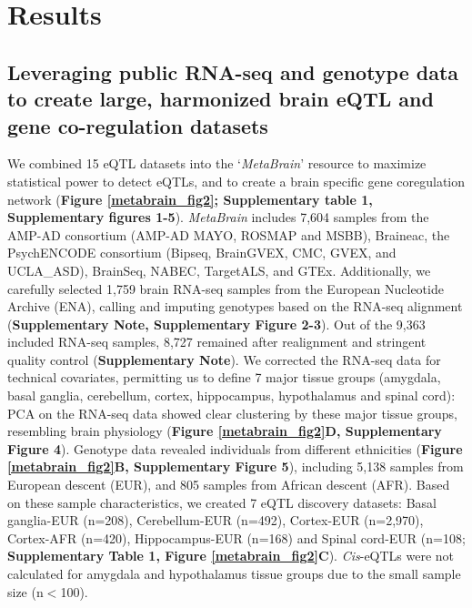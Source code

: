 \section{Results}
\subsection{Leveraging public RNA-seq and genotype data to create large, harmonized brain eQTL and gene co-regulation datasets}
We combined 15 eQTL datasets into the ‘\textit{MetaBrain}’ resource to maximize statistical power to detect eQTLs, and to create a brain specific gene coregulation network (\textbf{Figure \ref{metabrain_fig2}; Supplementary table 1, Supplementary figures 1-5}). \textit{MetaBrain} includes 7,604 samples from the AMP-AD consortium\cite{hodesAcceleratingMedicinesPartnership2016} (AMP-AD MAYO\cite{hodesAcceleratingMedicinesPartnership2016}, ROSMAP\cite{hodesAcceleratingMedicinesPartnership2016} and MSBB\cite{hodesAcceleratingMedicinesPartnership2016}), Braineac\cite{ramasamyGeneticVariabilityRegulation2014}, the PsychENCODE consortium\cite{consortium*RevealingBrainMolecular2018} (Bipseq\cite{wangComprehensiveFunctionalGenomic2018}, BrainGVEX\cite{wangComprehensiveFunctionalGenomic2018}, CMC\cite{fromerGeneExpressionElucidates2016}, GVEX, and UCLA\_ASD\cite{wangComprehensiveFunctionalGenomic2018}), BrainSeq\cite{brainseq2015}, NABEC\cite{gibbsAbundantQuantitativeTrait2010}, TargetALS\cite{prudencioDistinctBrainTranscriptome2015}, and GTEx\cite{donovanCellularDeconvolutionGTEx2020}. Additionally, we carefully selected 1,759 brain RNA-seq samples from the European Nucleotide Archive (ENA)\cite{leinonenEuropeanNucleotideArchive2011}, calling and imputing genotypes based on the RNA-seq alignment (\textbf{Supplementary Note, Supplementary Figure 2-3}). Out of the 9,363 included RNA-seq samples, 8,727 remained after realignment and stringent quality control (\textbf{Supplementary Note}). We corrected the RNA-seq data for technical covariates, permitting us to define 7 major tissue groups (amygdala, basal ganglia, cerebellum, cortex, hippocampus, hypothalamus and spinal cord): PCA on the RNA-seq data showed clear clustering by these major tissue groups, resembling brain physiology (\textbf{Figure \ref{metabrain_fig2}D, Supplementary Figure 4}). Genotype data revealed individuals from different ethnicities (\textbf{Figure \ref{metabrain_fig2}B, Supplementary Figure 5}), including 5,138 samples from European descent (EUR), and 805 samples from African descent (AFR). Based on these sample characteristics, we created 7 eQTL discovery datasets: Basal ganglia-EUR (n=208), Cerebellum-EUR (n=492), Cortex-EUR (n=2,970), Cortex-AFR (n=420), Hippocampus-EUR (n=168) and Spinal cord-EUR (n=108; \textbf{Supplementary Table 1, Figure \ref{metabrain_fig2}C}). \emph{Cis}-eQTLs were not calculated for amygdala and hypothalamus tissue groups due to the small sample size (n$<$100). 

